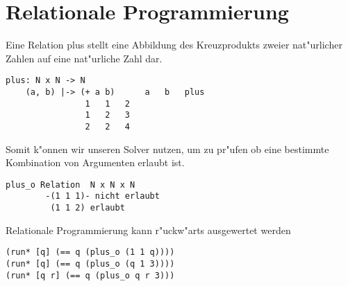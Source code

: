 \section{Relationale Programmierung}

Eine Relation plus stellt eine Abbildung des Kreuzprodukts zweier nat"urlicher Zahlen auf eine nat"urliche Zahl dar.

\begin{lstlisting}
plus: N x N -> N
    (a, b) |-> (+ a b)		a   b   plus
				1   1   2
				1   2   3
				2   2   4
\end{lstlisting}

Somit k"onnen wir unseren Solver nutzen, um zu pr"ufen ob eine bestimmte Kombination von Argumenten erlaubt ist.
\begin{lstlisting}
plus_o Relation	 N x N x N
		-(1 1 1)- nicht erlaubt
		 (1 1 2) erlaubt
\end{lstlisting}

Relationale Programmierung kann r"uckw"arts ausgewertet werden

\begin{lstlisting}
(run* [q] (== q (plus_o (1 1 q))))
(run* [q] (== q (plus_o (q 1 3))))
(run* [q r] (== q (plus_o q r 3)))
\end{lstlisting}

